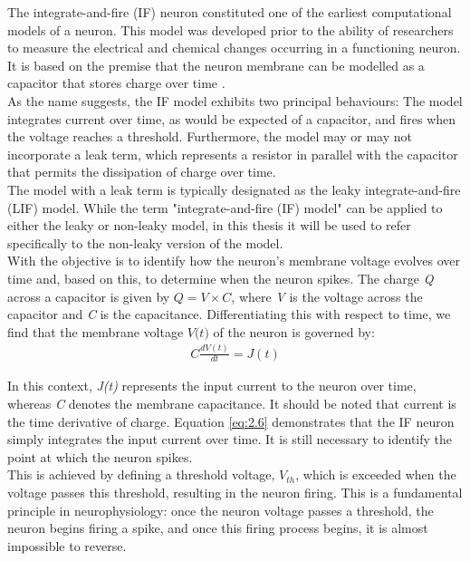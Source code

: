 \noindent The integrate-and-fire (IF) neuron \cite{lapicque1907louis} constituted one of the earliest computational models of a neuron. This model was developed prior to the ability of researchers to measure the electrical and chemical changes occurring in a functioning neuron. It is based on the premise that the neuron membrane can be modelled as a capacitor that stores charge over time \cite{abbott1999lapicque}.\\

\noindent As the name suggests, the IF model exhibits two principal behaviours: The model integrates current over time, as would be expected of a capacitor, and fires when the voltage reaches a threshold. Furthermore, the model may or may not incorporate a leak term, which represents a resistor in parallel with the capacitor that permits the dissipation of charge over time. \\

\noindent The model with a leak term is typically designated as the leaky integrate-and-fire (LIF) model. While the term "integrate-and-fire (IF) model" can be applied to either the leaky or non-leaky model, in this thesis it will be used to refer specifically to the non-leaky version of the model. \\

\noindent With the objective is to identify how the neuron's membrane voltage evolves over time and, based on this, to determine when the neuron spikes. The charge \textit{Q} across a capacitor is given by $Q = V \times C$, where \textit{V} is the voltage across the capacitor and \textit{C} is the capacitance. Differentiating this with respect to time, we find that the membrane voltage $\textit{V(t)}$ of the neuron is governed by:
\begin{align}
C \frac{dV(t)}{dt} = J(t) \label{eq:2.6} 
\end{align}

\noindent In this context, \textit{J(t)} represents the input current to the neuron over time, whereas \textit{C} denotes the membrane capacitance. It should be noted that current is the time derivative of charge. Equation \ref{eq:2.6} demonstrates that the IF neuron simply integrates the input current over time. It is still necessary to identify the point at which the neuron spikes. \\

\noindent This is achieved by defining a threshold voltage, $V_{th}$, which is exceeded when the voltage passes this threshold, resulting in the neuron firing. This is a fundamental principle in neurophysiology: once the neuron voltage passes a threshold, the neuron begins firing a spike, and once this firing process begins, it is almost impossible to reverse. \\

